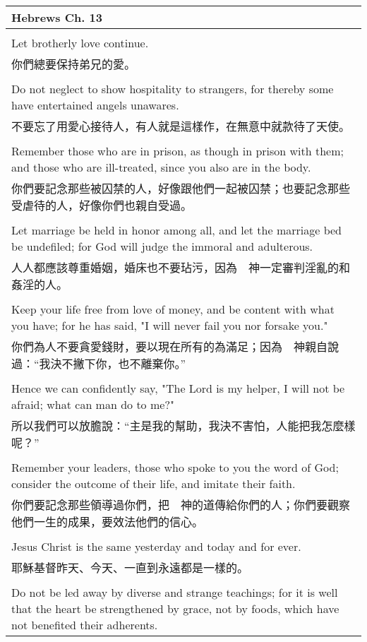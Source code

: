 \documentclass{book}
\begin{document}
\begin{tabularx}{\textwidth}{p{}}
\hline
Hebrews Ch. 13 \\
\hline \\
Let brotherly love continue. \\
你們總要保持弟兄的愛。 \\ \\
Do not neglect to show hospitality to strangers, for thereby some have entertained angels unawares. \\
不要忘了用愛心接待人，有人就是這樣作，在無意中就款待了天使。 \\ \\
Remember those who are in prison, as though in prison with them; and those who are ill-treated, since you also are in the body. \\
你們要記念那些被囚禁的人，好像跟他們一起被囚禁；也要記念那些受虐待的人，好像你們也親自受過。 \\ \\
Let marriage be held in honor among all, and let the marriage bed be undefiled; for God will judge the immoral and adulterous. \\
人人都應該尊重婚姻，婚床也不要玷污，因為　神一定審判淫亂的和姦淫的人。 \\ \\
Keep your life free from love of money, and be content with what you have; for he has said, "I will never fail you nor forsake you." \\
你們為人不要貪愛錢財，要以現在所有的為滿足；因為　神親自說過：“我決不撇下你，也不離棄你。” \\ \\
Hence we can confidently say, "The Lord is my helper, I will not be afraid; what can man do to me?" \\
所以我們可以放膽說：“主是我的幫助，我決不害怕，人能把我怎麼樣呢？” \\ \\
Remember your leaders, those who spoke to you the word of God; consider the outcome of their life, and imitate their faith. \\
你們要記念那些領導過你們，把　神的道傳給你們的人；你們要觀察他們一生的成果，要效法他們的信心。 \\ \\
Jesus Christ is the same yesterday and today and for ever. \\
耶穌基督昨天、今天、一直到永遠都是一樣的。 \\ \\
Do not be led away by diverse and strange teachings; for it is well that the heart be strengthened by grace, not by foods, which have not benefited their adherents. \\

\end{tabularx}
\end{document}
